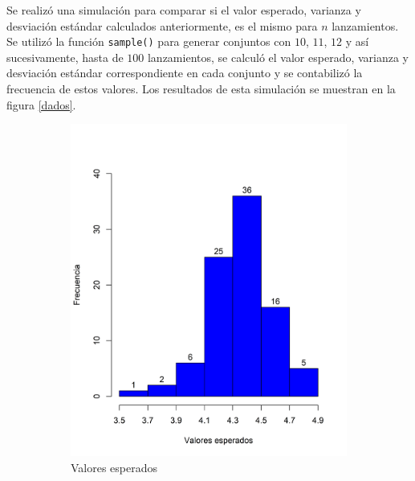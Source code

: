 \documentclass{article}
\begin{document}
Se realizó una simulación para comparar si el valor esperado, varianza y desviación estándar calculados anteriormente, es el mismo para $n$ lanzamientos. Se utilizó la función \texttt{sample()} para generar conjuntos con $10$, $11$, $12$ y así sucesivamente, hasta de $100$ lanzamientos, se calculó el valor esperado, varianza y desviación estándar correspondiente en cada conjunto y se contabilizó la frecuencia de estos valores. Los resultados de esta simulación se muestran en la figura \ref{dados}. 
\begin{figure}[htp]
    \begin{center}
    \captionsetup{justification=centering}
    \centering
    \begin{subfigure}{0.45\textwidth}
        \includegraphics[scale=0.55]{Figures/dadosVE.png}
        \caption{Valores esperados}
        \label{dadosVE}
    \end{subfigure}
    \begin{subfigure}{0.45\textwidth}

\end{subfigure}
\end{center}
\end{figure}
\end{document}
